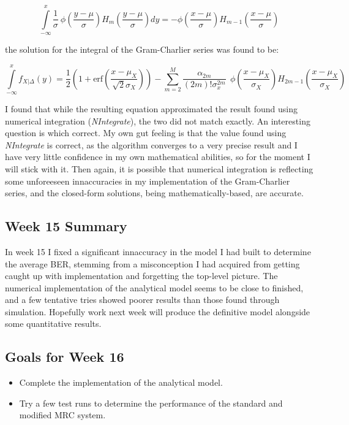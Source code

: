 \[
\int \limits_{-\infty}^x \frac{1}{\sigma} \: \phi \! \left ( \frac{y-\mu}{\sigma} \right ) H_m \! \left ( \frac{y-\mu}{\sigma} \right ) dy =
- \phi \! \left ( \frac{x-\mu}{\sigma} \right ) H_{m-1} \! \left ( \frac{x-\mu}{\sigma} \right )
\]

the solution for the integral of the Gram-Charlier series was found to
be:

\[
\int \limits_{- \infty}^x f_{X\vert \Delta}(y) = \frac{1}{2} \left ( 1 + \text{erf} \! \left ( \frac{x-\mu_X}{\sqrt{2} \sigma_X} \right ) \right ) - \sum \limits_{m=2}^M \frac{\alpha_{2m}}{(2m)! \sigma_x^{2m}} \: \: \phi \! \left ( \frac{x-\mu_X}{\sigma_X} \right ) H_{2m-1} \! \left ( \frac{x-\mu_X}{\sigma_X} \right )
\]

I found that while the resulting equation approximated the result found
using numerical integration (\emph{NIntegrate}), the two did not match
exactly. An interesting question is which correct. My own gut feeling is
that the value found using \emph{NIntegrate} is correct, as the
algorithm converges to a very precise result and I have very little
confidence in my own mathematical abilities, so for the moment I will
stick with it. Then again, it is possible that numerical integration is
reflecting some unforeeseen innaccuracies in my implementation of the
Gram-Charlier series, and the closed-form solutions, being
mathematically-based, are accurate.

\subsection{Week 15 Summary}

In week 15 I fixed a significant innaccuracy in the model I had built to
determine the average BER, stemming from a misconception I had acquired
from getting caught up with implementation and forgetting the top-level
picture. The numerical implementation of the analytical model seems to
be close to finished, and a few tentative tries showed poorer results
than those found through simulation. Hopefully work next week will
produce the definitive model alongside some quantitative results.

\subsection{Goals for Week 16}

\begin{itemize}
\itemsep1pt\parskip0pt
\item
  Complete the implementation of the analytical model.
\item
  Try a few test runs to determine the performance of the standard and
  modified MRC system.
\end{itemize}

